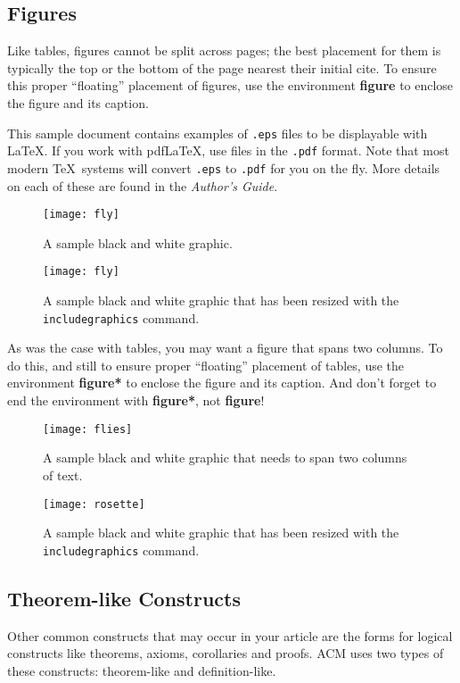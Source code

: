 \subsection{Figures}

Like tables, figures cannot be split across pages; the best placement
for them is typically the top or the bottom of the page nearest their
initial cite.  To ensure this proper ``floating'' placement of
figures, use the environment \textbf{figure} to enclose the figure and
its caption.

This sample document contains examples of \texttt{.eps} files to be
displayable with \LaTeX.  If you work with pdf\LaTeX, use files in the
\texttt{.pdf} format.  Note that most modern \TeX\ systems will convert
\texttt{.eps} to \texttt{.pdf} for you on the fly.  More details on
each of these are found in the \textit{Author's Guide}.

\begin{figure}
\texttt{[image: fly]}
\caption{A sample black and white graphic.}
\end{figure}

\begin{figure}
\texttt{[image: fly]}
\caption{A sample black and white graphic
that has been resized with the \texttt{includegraphics} command.}
\end{figure}


As was the case with tables, you may want a figure that spans two
columns.  To do this, and still to ensure proper ``floating''
placement of tables, use the environment \textbf{figure*} to enclose
the figure and its caption.  And don't forget to end the environment
with \textbf{figure*}, not \textbf{figure}!

\begin{figure*}
\texttt{[image: flies]}
\caption{A sample black and white graphic
that needs to span two columns of text.}
\end{figure*}


\begin{figure}
\texttt{[image: rosette]}
\caption{A sample black and white graphic that has
been resized with the \texttt{includegraphics} command.}
\end{figure}

\subsection{Theorem-like Constructs}

Other common constructs that may occur in your article are the forms
for logical constructs like theorems, axioms, corollaries and proofs.
ACM uses two types of these constructs:  theorem-like and
definition-like.


